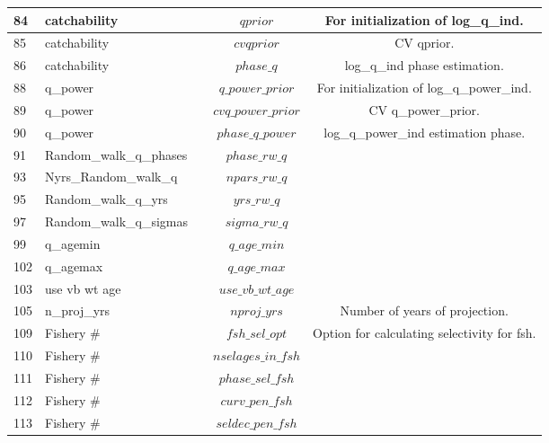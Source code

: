 \documentclass{article}
\begin{document}
\begin{tabular}{| p{0.9cm} | p{4.0cm}  | p{1.9cm} | c | c |}
84 & catchability &   &  $qprior$& For initialization of log\_q\_ind.\\ \hline
85 & catchability &   &  $cvqprior$& CV qprior.\\ \hline
86 & catchability &   &  $phase\_q$& log\_q\_ind phase estimation.\\ \hline
88 & q\_power &   & $q\_power\_prior$ & For initialization of log\_q\_power\_ind.\\ \hline
89 & q\_power &   & $cvq\_power\_prior$ & CV q\_power\_prior.\\ \hline
90 & q\_power &   & $phase\_q\_power$  & log\_q\_power\_ind estimation phase.\\ \hline
91 & Random\_walk\_q\_phases &   & $phase\_rw\_q$ &\\ \hline
93 & Nyrs\_Random\_walk\_q &   & $npars\_rw\_q$ &\\ \hline
95 & Random\_walk\_q\_yrs &   & $yrs\_rw\_q$ &\\ \hline
97 & Random\_walk\_q\_sigmas &   & $sigma\_rw\_q$ &\\ \hline
99 & q\_agemin &   & $q\_age\_min$ &\\ \hline
102 & q\_agemax &   & $q\_age\_max$  &\\ \hline
103 & use vb wt age &   & $use\_vb\_wt\_age$  &\\ \hline
105 & n\_proj\_yrs &   & $nproj\_yrs$ & Number of years of projection.\\ \hline
109 & Fishery \#  &   & $fsh\_sel\_opt$  & Option for calculating selectivity for fsh.\\ \hline
110 & Fishery \# &   & $nselages\_in\_fsh$  &\\ \hline
111 & Fishery \# &   & $phase\_sel\_fsh$  &\\ \hline
112 & Fishery \# &   & $curv\_pen\_fsh$ &\\ \hline
113 & Fishery \# &   & $seldec\_pen\_fsh$ &\\ \hline

\end{tabular} 
\end{document}

